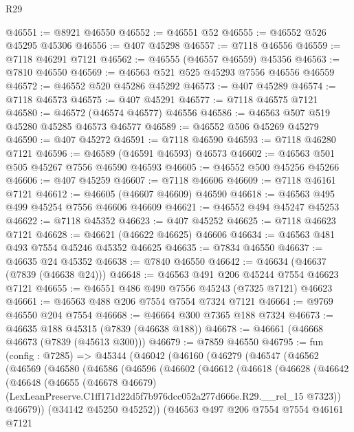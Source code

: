 \begin{lexlean}{R29}
\begin{coremodule}
@46551 := @8921 @46550
@46552 := @46551 @52
@46555 := @46552 @526 @45295 @45306
@46556 := @407 @45298
@46557 := @7118 @46556
@46559 := @7118 @46291 @7121
@46562 := @46555 (@46557 @46559) @45356
@46563 := @7810 @46550
@46569 := @46563 @521 @525 @45293 @7556 @46556 @46559
@46572 := @46552 @520 @45286 @45292
@46573 := @407 @45289
@46574 := @7118 @46573
@46575 := @407 @45291
@46577 := @7118 @46575 @7121
@46580 := @46572 (@46574 @46577) @46556
@46586 := @46563 @507 @519 @45280 @45285 @46573 @46577
@46589 := @46552 @506 @45269 @45279
@46590 := @407 @45272
@46591 := @7118 @46590
@46593 := @7118 @46280 @7121
@46596 := @46589 (@46591 @46593) @46573
@46602 := @46563 @501 @505 @45267 @7556 @46590 @46593
@46605 := @46552 @500 @45256 @45266
@46606 := @407 @45259
@46607 := @7118 @46606
@46609 := @7118 @46161 @7121
@46612 := @46605 (@46607 @46609) @46590
@46618 := @46563 @495 @499 @45254 @7556 @46606 @46609
@46621 := @46552 @494 @45247 @45253
@46622 := @7118 @45352
@46623 := @407 @45252
@46625 := @7118 @46623 @7121
@46628 := @46621 (@46622 @46625) @46606
@46634 := @46563 @481 @493 @7554 @45246 @45352 @46625
@46635 := @7834 @46550
@46637 := @46635 @24 @45352
@46638 := @7840 @46550
@46642 := @46634 (@46637 (@7839 (@46638 @24)))
@46648 := @46563 @491 @206 @45244 @7554 @46623 @7121
@46655 := @46551 @486 @490 @7556 @45243 (@7325 @7121) @46623
@46661 := @46563 @488 @206 @7554 @7554 @7324 @7121
@46664 := @9769 @46550 @204 @7554
@46668 := @46664 @300 @7365 @188 @7324
@46673 := @46635 @188 @45315 (@7839 (@46638 @188))
@46678 := @46661 (@46668 @46673 (@7839 (@45613 @300)))
@46679 := @7859 @46550
@46795 := fun (config : @7285) =>
  @45344
    (@46042
      (@46160
        (@46279
          (@46547
            (@46562
              (@46569
                (@46580
                  (@46586
                    (@46596
                      (@46602
                        (@46612
                          (@46618
                            (@46628
                              (@46642
                                (@46648
                                  (@46655
                                    (@46678 @46679)
                                    (LexLeanPreserve.C1ff171d22d5f7b976dcc052a277d666e.R29.__rel_15
                                      @7323))
                                  @46679))
                              (@34142 @45250 @45252))
                            (@46563
                              @497
                              @206
                              @7554
                              @7554
                              @46161
                              @7121

\end{coremodule}
\end{lexlean}
